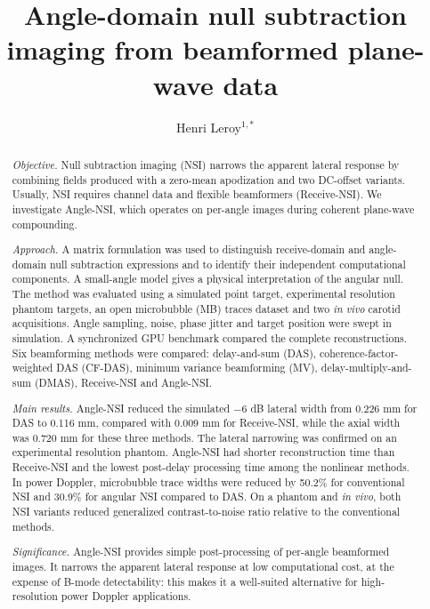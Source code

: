 \documentclass{iopjournal}
\providecommand{\revstart}{}
\providecommand{\revstop}{}
\begin{document}

\title{Angle-domain null subtraction imaging from beamformed plane-wave data}

\author{Henri Leroy$^{1,*}$}





\begin{abstract}
\textit{Objective.} Null subtraction imaging (NSI) narrows the apparent lateral
response by combining fields produced with a zero-mean apodization and two
DC-offset variants. \revstart Usually, NSI requires channel data and flexible beamformers (Receive-NSI). We investigate Angle-NSI, \revstop which operates on per-angle images during coherent plane-wave compounding.

\textit{Approach.} A matrix formulation was used to distinguish receive-domain
and angle-domain null subtraction expressions and to identify their independent
computational components. \revstart A small-angle model gives a physical
interpretation of the angular null.\revstop{} The method was evaluated using a
simulated point target, \revstart experimental resolution phantom targets,\revstop{} an open microbubble (MB) traces dataset and two
\textit{in vivo} carotid acquisitions. Angle sampling, noise, phase jitter and target position were swept in
simulation. A synchronized GPU benchmark compared the complete reconstructions. \revstart Six beamforming methods were compared:
delay-and-sum (DAS), coherence-factor-weighted DAS (CF-DAS), minimum variance beamforming
(MV), delay-multiply-and-sum (DMAS), Receive-NSI and Angle-NSI.\revstop{}

\textit{Main results.} \revstart Angle-NSI \revstop reduced the simulated $-6$ dB lateral width
from 0.226 mm for DAS to 0.116 mm,
compared with 0.009 mm for \revstart Receive-NSI\revstop, while the axial width was 0.720 mm for these three methods. \revstart The lateral narrowing was confirmed on an experimental resolution phantom. Angle-NSI had shorter reconstruction time than Receive-NSI and the lowest post-delay processing time among the nonlinear methods. \revstop In power Doppler, microbubble trace widths were reduced by 50.2\% for conventional NSI and 30.9\% for angular NSI compared to DAS. \revstart On a phantom and \revstop \textit{in vivo}, both NSI variants reduced generalized contrast-to-noise ratio relative to \revstart the
conventional methods\revstop.

\textit{Significance.} \revstart Angle-NSI provides simple post-processing of per-angle beamformed images. It narrows the apparent lateral response at low computational cost, at the expense of B-mode detectability: this makes it a well-suited alternative for high-resolution power Doppler applications. \revstop 
\end{abstract}
\end{document}

